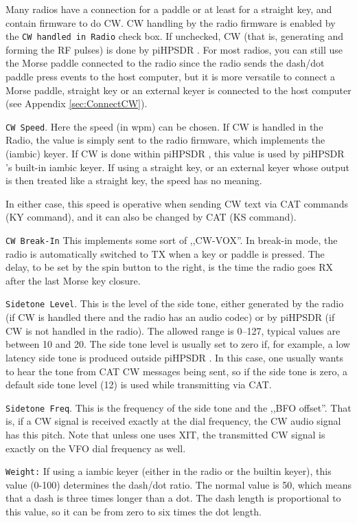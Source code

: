 \documentclass[12pt]{book}
\def\rett#1{\texttt{\color{red}#1}}
\def\pH{pi\-HPSDR }
\begin{document}
Many radios have a connection for a paddle or at least for
a straight key, and contain firmware to do CW. CW handling by
the radio firmware is enabled by the \rett{CW handled in Radio}
check box. If unchecked, CW (that is, generating and forming
the RF pulses) is done by \pH. For most radios, you can
still use the Morse paddle connected to the radio since the
radio sends the dash/dot paddle press events to the host
computer, but it is more versatile to connect
a Morse paddle, straight key or an external keyer is connected
to the host computer (see Appendix \ref{sec:ConnectCW}).

\rett{CW Speed}. Here the speed (in wpm) can be chosen. If CW is
handled in the Radio, the value is simply sent to the radio firmware,
which implements the (iambic) keyer. If CW is done within \pH,
this value is used by \pH's built-in iambic keyer. If using
a straight key, or an external keyer whose output is then treated
like a straight key, the speed has no meaning.

In either case, this speed is operative when sending CW text via
CAT commands (KY command), and it can also be changed by CAT
(KS command).

\rett{CW Break-In} This implements some sort of ,,CW-VOX''. In
break-in mode, the radio is automatically switched to TX when
a key or paddle is pressed. The delay, to be set by the spin
button to the right, is the time the radio goes RX after the
last Morse key closure.

\rett{Sidetone Level}. This is the level of the side tone,
either generated by the radio (if CW is handled there and the radio
has an audio codec) or
by \pH (if CW is not handled in the radio). The allowed range
is 0--127, typical values are between 10 and 20. The side tone level
is usually set to zero if, for example, a low latency side tone is
produced outside \pH. In this case, one usually wants to hear
the tone from CAT CW messages being sent, so if the side tone is
zero, a default side tone level (12) is used while transmitting
via CAT.

\rett{Sidetone Freq}. This is the frequency of the side tone and the
,,BFO offset''. That is, if a CW signal is received exactly at the
dial frequency, the CW audio signal has this pitch. Note that unless
one uses XIT, the transmitted CW signal is exactly on the VFO dial
frequency as well.

\rett{Weight:} If using a iambic keyer (either in the radio or
the builtin keyer), this value (0-100) determines the dash/dot ratio.
The normal value is 50, which means that a dash is three times longer
than a dot. The dash length is proportional to this value, so it can
be from zero to six times the dot length.
\end{document}
